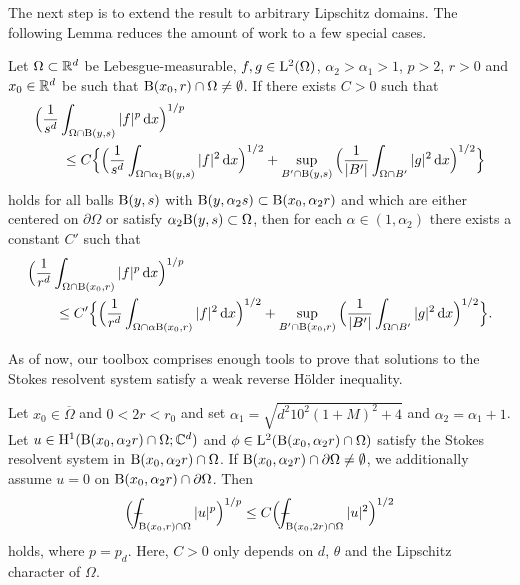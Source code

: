 The next step is to extend the result to arbitrary Lipschitz domains. The following Lemma reduces the amount of work to a few special cases.

\begin{lem}[Tolksdorf]
  \label{lem:ballsforballs}
  Let $\Omega \subset \mathbb{R}^d$ be Lebesgue-measurable, $f, g \in \mathrm{L}^2(\Omega)$, $\alpha_2 > \alpha_1 > 1$, $p > 2$, $r > 0$ and $x_0 \in \mathbb{R}^d$ be such that $\mathrm{B}(x_0, r) \cap \Omega \neq \emptyset$.
  If there exists $C > 0$ such that
  \begin{align*}
    &\Big( \frac{1}{s^d} \int_{\Omega \cap \mathrm{B}(y, s)} |f|^p \, {\operatorname{d}\!{x}} \Big)^{1/p} \\
    &\qquad\leq C \Big\{ \Big( \frac{1}{s^d} \int_{\Omega \cap \alpha_1 \mathrm{B}(y, s)} |f|^2 \, {\operatorname{d}\!{x}} \Big)^{1/2} + \sup_{B' \cap \mathrm{B}(y,s)} \Big( \frac{1}{|B'|} \int_{\Omega \cap B'} |g|^2 \, {\operatorname{d}\!{x}} \Big)^{1/2} \Big\}
  \end{align*}
  holds for all balls $\mathrm{B}(y,s)$ with $\mathrm{B}(y,\alpha_2 s) \subset \mathrm{B}(x_0, \alpha_2 r)$ and which are either centered on $\partial\Omega$ or satisfy $\alpha_2 \mathrm{B}(y,s) \subset \Omega$, then for each $\alpha \in (1,\alpha_2)$ there exists a constant $C'$ such that
  \begin{align*}
    &\Big( \frac{1}{r^d} \int_{\Omega \cap \mathrm{B}(x_0, r)} |f|^p \, {\operatorname{d}\!{x}} \Big)^{1/p} 
    \\
    &\qquad\leq C' \Big\{ \Big( \frac{1}{r^d} \int_{\Omega \cap \alpha \mathrm{B}(x_0, r)} |f|^2 \, {\operatorname{d}\!{x}} \Big)^{1/2} + \sup_{B' \cap \mathrm{B}(x_0,r)} \Big( \frac{1}{|B'|} \int_{\Omega \cap B'} |g|^2 \, {\operatorname{d}\!{x}} \Big)^{1/2} \Big\}.
  \end{align*}
\end{lem}

As of now, our toolbox comprises enough tools to prove that solutions to the Stokes resolvent system satisfy a weak reverse H\"older inequality.

\begin{lem}
  \label{lem:reverseHoelder}
  Let $x_0 \in \overline\Omega$ and $0 < 2r < r_0$ and set $\alpha_1 = \sqrt{d^2 10^2 (1 + M)^2 + 4}$ and $\alpha_2 = \alpha_1 + 1$.
  Let $u \in \mathrm{H}^1(\mathrm{B}(x_0,  \alpha_2 r) \cap \Omega; \mathbb{C}^d)$ and $\phi \in \mathrm{L}^2(\mathrm{B}(x_0, \alpha_2 r) \cap \Omega)$ satisfy the Stokes resolvent system in $\mathrm{B}(x_0, \alpha_2 r) \cap \Omega$. 
  If $\mathrm{B}(x_0, \alpha_2 r) \cap \partial \Omega \neq \emptyset $, we additionally assume $u = 0$ on $\mathrm{B}(x_0, \alpha_2 r) \cap \partial\Omega$.
  Then
  \begin{align}
    \label{eq:reverseHoelder}
    \Big( \dashint_{\BB(x_0, r) \cap \Omega} |u|^p \Big)^{1/p} \leq C \Big( \dashint_{\BB(x_0, 2 r) \cap \Omega} |u|^2 \Big)^{1/2}
  \end{align}
  holds, where $p = p_d$.
  Here, $C > 0$ only depends on $d$, $\theta$ and the Lipschitz character of $\Omega$.
\end{lem}

